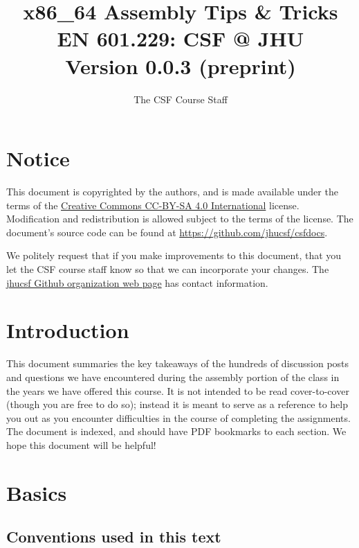\documentclass[11pt]{article}
\begin{document}
\title{x86\_64 Assembly Tips \& Tricks \\
\large EN 601.229: CSF @ JHU\\
Version 0.0.3 (preprint)}
\author{The CSF Course Staff}
\maketitle

\tableofcontents
\newpage

\section{Notice}

This document is copyrighted by the authors, and is
made available under the terms of the
\href{https://creativecommons.org/licenses/by-sa/4.0/}{Creative Commons CC-BY-SA 4.0 International}
license. Modification and redistribution is allowed subject to the terms
of the license. The document's source code can be found at
\url{https://github.com/jhucsf/csfdocs}.

We politely request that if you make improvements to this document,
that you let the CSF course staff know so that we can incorporate your
changes. The \href{https://github.com/jhucsf}{jhucsf Github organization web page}
has contact information.

\newpage

\section{Introduction}

This document summaries the key takeaways of the hundreds of discussion posts and questions we
have encountered during the assembly portion of the class in the years we have offered
this course. It is not intended to be read cover-to-cover (though you are free to do so);
instead it is meant to serve as a reference to help you out as you encounter difficulties
in the course of completing the assignments. The document is indexed, and should have PDF
bookmarks to each section. We hope this document will be helpful!

\section{Basics}

\subsection{Conventions used in this text}
\end{document}
